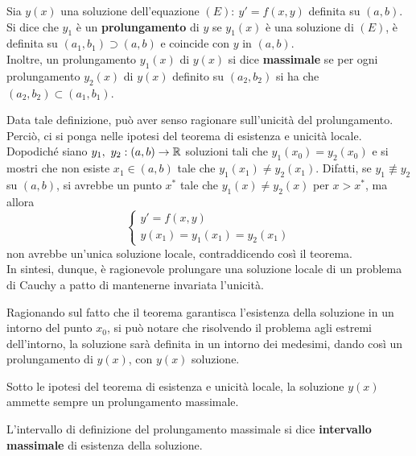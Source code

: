 \begin{definition} \label{Prolungamento}
    Sia $y(x)$ una soluzione dell'equazione $(E):\ y'=f(x,y)$ definita su $(a,b)$. Si dice che $y_1$ è un \textbf{prolungamento} di $y$ se $y_1(x)$ è una soluzione di $(E)$, è definita su $(a_1, b_1) \supset (a,b)$ e coincide con $y$ in $(a,b)$.\\
    Inoltre, un prolungamento $y_1(x)$ di $y(x)$ si dice \textbf{massimale} se per ogni prolungamento $y_2(x)$ di $y(x)$ definito su $(a_2, b_2)$ si ha che $(a_2, b_2) \subset (a_1, b_1)$.
\end{definition}
\begin{oss}
Data tale definizione, può aver senso ragionare sull'unicità del prolungamento. Perciò, ci si ponga nelle ipotesi del teorema di esistenza e unicità locale. Dopodiché siano $y_1,\ y_2 : (a,b) \to \mathbb{R}$ soluzioni tali che $y_1(x_0)=y_2(x_0)$ e si mostri che non esiste $x_1 \in (a,b)$ tale che $y_1(x_1) \neq y_2(x_1)$. Difatti, se $y_1 \not\equiv y_2$ su $(a,b)$, si avrebbe un punto $x^*$ tale che $y_1(x) \neq y_2(x)$ per $x>x^*$, ma allora
\begin{equation*}
    \begin{cases}    
    y'=f(x,y)\\
    y(x_1)=y_1(x_1)=y_2(x_1)
    \end{cases}
\end{equation*}
non avrebbe un'unica soluzione locale, contraddicendo così il teorema.\\
In sintesi, dunque, è ragionevole prolungare una soluzione locale di un problema di Cauchy a patto di mantenerne invariata l'unicità.
\end{oss}
Ragionando sul fatto che il teorema garantisca l'esistenza della soluzione in un intorno del punto $x_0$, si può notare che risolvendo il problema agli estremi dell'intorno, la soluzione sarà definita in un intorno dei medesimi, dando così un prolungamento di $y(x)$, con $y(x)$ soluzione. 
\begin{theorem}
    Sotto le ipotesi del teorema di esistenza e unicità locale, la soluzione $y(x)$ ammette sempre un prolungamento massimale.
\end{theorem}
\begin{definition}
    L'intervallo di definizione del prolungamento massimale si dice \textbf{intervallo massimale} di esistenza della soluzione.
\end{definition}

